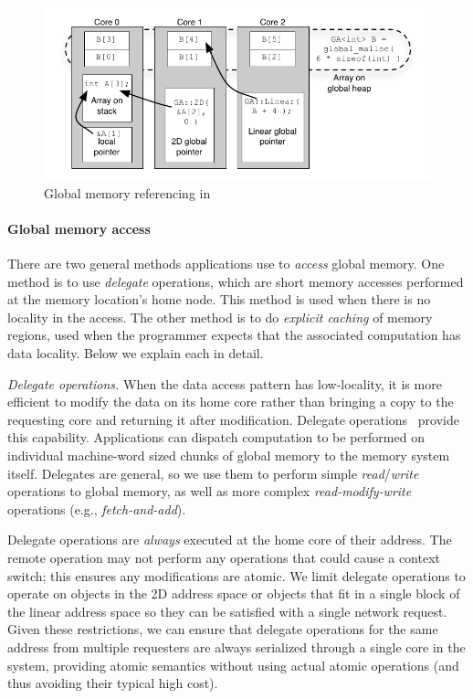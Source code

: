 \begin{figure}[t]
\begin{center}
  \includegraphics[width=0.95\columnwidth]{figs/memory-structure}
\begin{minipage}{0.95\columnwidth}
  \caption{\label{fig:memory-structure} Global memory referencing in \Grappa}
\end{minipage}
\vspace{-3ex}
\end{center}
\end{figure}

\paragraph{Global memory access} There are two general methods \Grappa
applications use to {\em access} global memory. One method is to use {\em
delegate} operations, which are short memory accesses performed at the memory
location's home node. This method is used when there is no locality in the
access. The other method is to do {\em explicit caching} of memory regions,
used when the programmer expects that the associated computation has data
locality. Below we explain each in detail.


\vspace{1ex} \textit{Delegate operations.} When the data access pattern has
low-locality, it is more efficient to modify the data on its home core rather
than bringing a copy to the requesting core and returning it after
modification. Delegate operations~\cite{Nelson:hotpar11, delegated:oopsla11}
provide this capability. Applications can dispatch computation to be performed
on individual machine-word sized chunks of global memory to the memory system
itself. Delegates are general, so we use them to perform simple
\emph{read\/}/\emph{write\/} operations to global memory, as well as more complex \emph{read-modify-write\/} operations (e.g., \emph{fetch-and-add\/}). 

Delegate operations are \emph{always\/} executed at the home core of their
address. The remote operation may not perform any operations that could cause
a context switch; this ensures any modifications are atomic. We limit delegate
operations to operate on objects in the 2D address space or objects that fit
in a single block of the linear address space so they can be satisfied with a
single network request. Given these restrictions, we can ensure that delegate
operations for the same address from multiple requesters are always serialized
through a single core in the system, providing atomic semantics without using
actual atomic operations (and thus avoiding their typical high cost).


